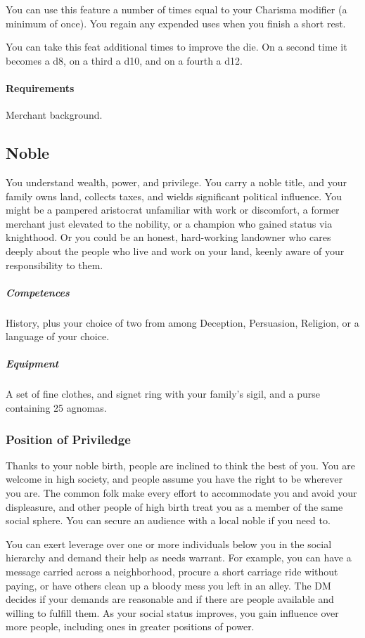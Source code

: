             You can use this feature a number of times equal to your Charisma modifier (a minimum of once).
            You regain any expended uses when you finish a short rest.

            You can take this feat additional times to improve the die.
            On a second time it becomes a d8, on a third a d10, and on a fourth a d12.
            \paragraph{Requirements} Merchant background.
\subsection*{Noble} \label{ssec::noble}
    You understand wealth, power, and privilege.
    You carry a noble title, and your family owns land, collects taxes, and wields significant political influence.
    You might be a pampered aristocrat unfamiliar with work or discomfort, a former merchant just elevated to the nobility, or a champion who gained status via knighthood.
    Or you could be an honest, hard-working landowner who cares deeply about the people who live and work on your land, keenly aware of your responsibility to them.

    \subparagraph{Competences} History, plus your choice of two from among Deception, Persuasion, Religion, or a language of your choice.

    \subparagraph{Equipment} A set of fine clothes, and signet ring with your family's sigil, and a purse containing 25 agnomas.

    \subsubsection{Position of Priviledge}
        Thanks to your noble birth, people are inclined to think the best of you.
        You are welcome in high society, and people assume you have the right to be wherever you are.
        The common folk make every effort to accommodate you and avoid your displeasure, and other people of high birth treat you as a member of the same social sphere.
        You can secure an audience with a local noble if you need to.

        You can exert leverage over one or more individuals below you in the social hierarchy and demand their help as needs warrant.
        For example, you can have a message carried across a neighborhood, procure a short carriage ride without paying, or have others clean up a bloody mess you left in an alley.
        The DM decides if your demands are reasonable and if there are people available and willing to fulfill them.
        As your social status improves, you gain influence over more people, including ones in greater positions of power.

